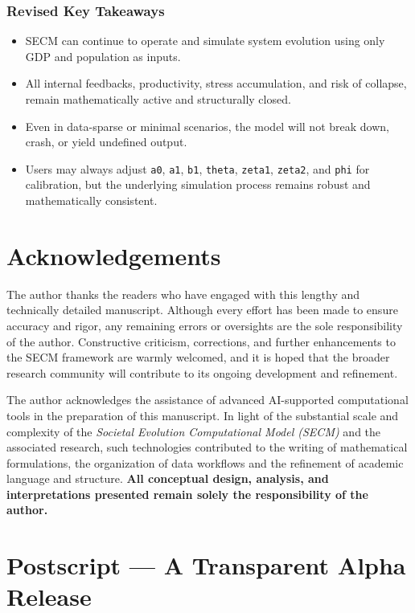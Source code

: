 \documentclass[12pt]{report}
\begin{document}
\subsubsection*{Revised Key Takeaways}
\begin{itemize}
    \item SECM can continue to operate and simulate system evolution using only GDP and population as inputs.
    \item All internal feedbacks, productivity, stress accumulation, and risk of collapse, remain mathematically active and structurally closed.
    \item Even in data-sparse or minimal scenarios, the model will not break down, crash, or yield undefined output.
    \item Users may always adjust \texttt{a0}, \texttt{a1}, \texttt{b1}, \texttt{theta}, \texttt{zeta1}, \texttt{zeta2}, and \texttt{phi} for calibration, but the underlying simulation process remains robust and mathematically consistent.
\end{itemize}

\section*{Acknowledgements}

The author thanks the readers who have engaged with this lengthy and technically detailed manuscript. Although every effort has been made to ensure accuracy and rigor, any remaining errors or oversights are the sole responsibility of the author. Constructive criticism, corrections, and further enhancements to the SECM framework are warmly welcomed, and it is hoped that the broader research community will contribute to its ongoing development and refinement.

The author acknowledges the assistance of advanced AI-supported computational tools in the preparation of this manuscript. In light of the substantial scale and complexity of the \textit{Societal Evolution Computational Model (SECM)} and the associated research, such technologies contributed to the writing of mathematical formulations, the organization of data workflows and the refinement of academic language and structure. \textbf{All conceptual design, analysis, and interpretations presented remain solely the responsibility of the author.}
\section*{Postscript — A Transparent Alpha Release}
\end{document}
